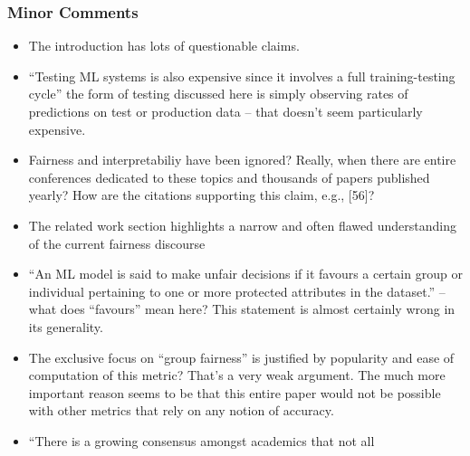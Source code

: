 \documentclass[conference,review,anonymous]{IEEEtran}
\newcommand{\highlight}[1]{\begin{framed}%
  \noindent\emph{#1}
\end{framed}}
\begin{document}
\highlight{}

\subsubsection{Minor Comments}
\begin{itemize}
  \item The introduction has lots of questionable claims.
  \item ``Testing ML systems is also expensive since it involves
    a full training-testing cycle'' the form of testing discussed here
    is simply observing rates of predictions on test or production
    data -- that doesn’t seem particularly expensive.
  \item Fairness and interpretabiliy have been ignored? Really, when
    there are entire conferences dedicated to these topics and
    thousands of papers published yearly? How are the citations
    supporting this claim, e.g., [56]?
  \item The related work section highlights a narrow and often flawed
    understanding of the current fairness discourse
  \item ``An ML model is said to make unfair decisions if it favours
    a certain group or individual pertaining to one or more protected
    attributes in the dataset.'' -- what does ``favours'' mean here?
    This statement is almost certainly wrong in its generality.
  \item The exclusive focus on ``group fairness'' is justified by
    popularity and ease of computation of this metric? That’s a very
    weak argument. The much more important reason seems to be that
    this entire paper would not be possible with other metrics that
    rely on any notion of accuracy.
  \item ``There is a growing consensus amongst academics that not all

\end{itemize}
\end{document}
